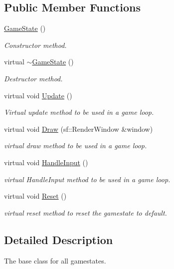 \subsection*{Public Member Functions}
\begin{DoxyCompactItemize}
\item 
\hyperlink{class_game_state_a4fa0a2bf50315c4a35a3890a0adcee5c}{Game\+State} ()
\begin{DoxyCompactList}\small\item\em Constructor method. \end{DoxyCompactList}\item 
virtual \hyperlink{class_game_state_ae623df5042cd0c17daa3394fdcb397b3}{$\sim$\+Game\+State} ()
\begin{DoxyCompactList}\small\item\em Destructor method. \end{DoxyCompactList}\item 
virtual void \hyperlink{class_game_state_a5be51b634f95bc6e57066ad6931aa18b}{Update} ()
\begin{DoxyCompactList}\small\item\em Virtual update method to be used in a game loop. \end{DoxyCompactList}\item 
virtual void \hyperlink{class_game_state_a8741c5c696c6c366beb4b845c08c3cf8}{Draw} (sf\+::\+Render\+Window \&window)
\begin{DoxyCompactList}\small\item\em virtual draw method to be used in a game loop. \end{DoxyCompactList}\item 
virtual void \hyperlink{class_game_state_a8bce2828cee99ae7c07322804531fd01}{Handle\+Input} ()
\begin{DoxyCompactList}\small\item\em virtual Handle\+Input method to be used in a game loop. \end{DoxyCompactList}\item 
virtual void \hyperlink{class_game_state_a46ac6317883dff0eba4f8f305af6b6bb}{Reset} ()
\begin{DoxyCompactList}\small\item\em virtual reset method to reset the gamestate to default. \end{DoxyCompactList}\end{DoxyCompactItemize}


\subsection{Detailed Description}
The base class for all gamestates. 

